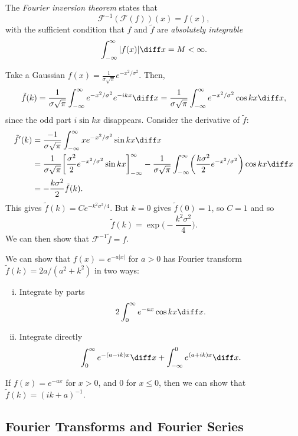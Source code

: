 \documentclass[12pt]{article}
\begin{document}
The \textit{Fourier inversion theorem} states that
\[
	\mathcal{F}^{-1}(\mathcal{F}(f))(x) = f(x)
,\]
with the sufficient condition that $f$ and $\tilde f$ are \textit{absolutely integrable}
\[
	\int_{-\infty}^{\infty}|f(x)| \diff x = M < \infty
.\]

\begin{exbox}
	Take a Gaussian $f(x) = \frac{1}{\sigma \sqrt \pi} e^{-x^2/\sigma^2}$. Then,
	\[
		\tilde f(k) = \frac{1}{\sigma \sqrt \pi} \int_{-\infty}^{\infty} e^{-x^2/\sigma^2}e^{-ikx} \diff x = \frac{1}{\sigma \sqrt \pi} \int_{-\infty}^{\infty} e^{-x^2/\sigma^2} \cos kx \diff x
	,\]
	since the odd part $i \sin kx$ disappears. Consider the derivative of $\tilde f$:
	\begin{align*}
		\tilde f'(k) &= \frac{-1}{\sigma \sqrt \pi} \int_{-\infty}^{\infty} x e^{-x^2/\sigma^2} \sin kx \diff x \\
			     &= \frac{1}{\sigma \sqrt \pi} \biggl[ \frac{\sigma^2}{2} e^{-x^2/\sigma^2} \sin kx \biggr]_{-\infty}^{\infty} - \frac{1}{\sigma \sqrt \pi} \int_{-\infty}^{\infty} \biggl( \frac{k \sigma^2}{2} e^{-x^2/\sigma^2}\biggr) \cos kx \diff x \\
			     &= - \frac{k \sigma^2}{2} \tilde f(k).
	\end{align*}
	This gives $\tilde f(k) = C e^{- k^2 \sigma^2/4}$. But $k = 0$ gives $\tilde f (0) = 1$, so $C = 1$ and so
	\[
		\tilde f(k) = \exp \biggl( - \frac{k^2\sigma^2}{4} \biggr)
	.\]
	We can then show that $\mathcal{F}^{-1} \tilde f = f$.
\end{exbox}

\begin{exbox}
	We can show that $f(x) = e^{-a|x|}$ for $a > 0$ has Fourier transform $\tilde f(k) = 2a/(a^2 + k^2)$ in two ways:
	\begin{enumerate}[(i)]
		\item Integrate by parts
			\[
			2 \int_{0}^{\infty} e^{-ax} \cos k x \diff x
			.\]
		\item Integrate directly
			\[
				\int_{0}^{\infty} e^{-(a-ik)x}\diff x + \int_{-\infty}^{0}e^{(a + ik)x}\diff x
			.\]
	\end{enumerate}
	If $f(x)=  e^{-ax}$ for $x > 0$, and $0$ for $x \leq 0$, then we can show that $\tilde f(k) = (ik+a)^{-1}$.
\end{exbox}

\subsection{Fourier Transforms and Fourier Series}%
\label{sub:fourier_transforms_and_fourier_series}
\end{document}
